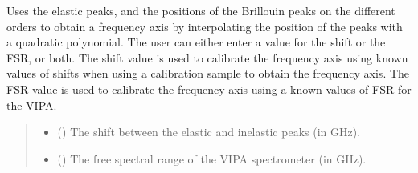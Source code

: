 \documentclass[letterpaper,10pt,english]{sphinxmanual}
\begin{document}
\begin{fulllineitems}
\begin{fulllineitems}
\begin{quote}
\begin{description}
\end{description}\end{quote}

\end{fulllineitems}


\begin{fulllineitems}
\label{\detokenize{source/HDF5_BLS:HDF5_BLS.analyze.Analyze_VIPA.interpolate_elastic_inelastic}}
\pysigstartsignatures
\pysiglinewithargsret
{}
{\sphinxparamcomma {}}
{}
\pysigstopsignatures
\sphinxAtStartPar
Uses the elastic peaks, and the positions of the Brillouin peaks on the different orders to obtain a frequency axis by interpolating the position of the peaks with a quadratic polynomial. The user can either enter a value for the shift or the FSR, or both. The shift value is used to calibrate the frequency axis using known values of shifts when using a calibration sample to obtain the frequency axis. The FSR value is used to calibrate the frequency axis using a known values of FSR for the VIPA.
\begin{quote}\begin{description}
\begin{itemize}
\item {} 
\sphinxAtStartPar
{} () \textendash{} The shift between the elastic and inelastic peaks (in GHz).

\item {} 
\sphinxAtStartPar
{} () \textendash{} The free spectral range of the VIPA spectrometer (in GHz).

\end{itemize}

\end{description}\end{quote}

\end{fulllineitems}


\end{fulllineitems}
\end{document}
